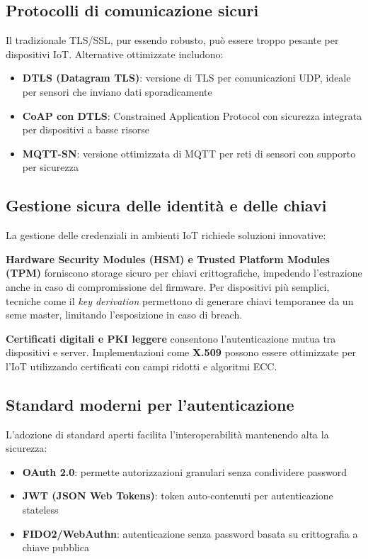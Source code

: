 \subsection{Protocolli di comunicazione sicuri}

Il tradizionale TLS/SSL, pur essendo robusto, può essere troppo pesante per dispositivi IoT. Alternative ottimizzate includono:

\begin{itemize}
    \item \textbf{DTLS (Datagram TLS)}: versione di TLS per comunicazioni UDP, ideale per sensori che inviano dati sporadicamente
    \item \textbf{CoAP con DTLS}: Constrained Application Protocol con sicurezza integrata per dispositivi a basse risorse
    \item \textbf{MQTT-SN}: versione ottimizzata di MQTT per reti di sensori con supporto per sicurezza
\end{itemize}

\subsection{Gestione sicura delle identità e delle chiavi}

La gestione delle credenziali in ambienti IoT richiede soluzioni innovative:

\textbf{Hardware Security Modules (HSM) e Trusted Platform Modules (TPM)} forniscono storage sicuro per chiavi crittografiche, impedendo l'estrazione anche in caso di compromissione del firmware. Per dispositivi più semplici, tecniche come il \textit{key derivation} permettono di generare chiavi temporanee da un seme master, limitando l'esposizione in caso di breach.

\textbf{Certificati digitali e PKI leggere} consentono l'autenticazione mutua tra dispositivi e server. Implementazioni come \textbf{X.509} possono essere ottimizzate per l'IoT utilizzando certificati con campi ridotti e algoritmi ECC.

\subsection{Standard moderni per l'autenticazione}

L'adozione di standard aperti facilita l'interoperabilità mantenendo alta la sicurezza:

\begin{itemize}
    \item \textbf{OAuth 2.0}: permette autorizzazioni granulari senza condividere password
    \item \textbf{JWT (JSON Web Tokens)}: token auto-contenuti per autenticazione stateless
    \item \textbf{FIDO2/WebAuthn}: autenticazione senza password basata su crittografia a chiave pubblica
\end{itemize}

